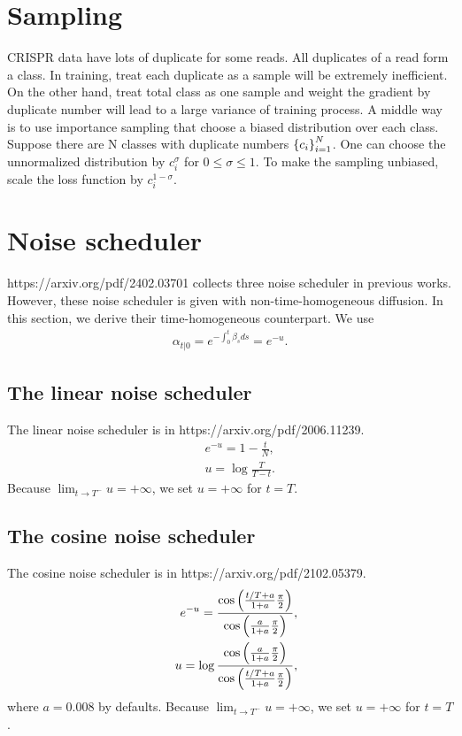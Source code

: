 \documentclass[10pt]{article}
\begin{document}
\section{Sampling}
CRISPR data have lots of duplicate for some reads. All duplicates of a read form a class. In training, treat each duplicate as a sample will be extremely inefficient. On the other hand, treat total class as one sample and weight the gradient by duplicate number will lead to a large variance of training process. A middle way is to use importance sampling that choose a biased distribution over each class. Suppose there are N classes with duplicate numbers $\qty{c_i}_{i=1}^N$. One can choose the unnormalized distribution by $c_i^\sigma$ for $0\le \sigma \le 1$. To make the sampling unbiased, scale the loss function by $c_i^{1-\sigma}$.

\section{Noise scheduler}

https://arxiv.org/pdf/2402.03701 collects three noise scheduler in previous works. However, these noise scheduler is given with non-time-homogeneous diffusion. In this section, we derive their time-homogeneous counterpart. We use
\begin{eqnarray*}
  \alpha_{t|0}= e^{-\int_0^t \beta_s ds} = e^{-u}.
\end{eqnarray*}

\subsection{The linear noise scheduler}
The linear noise scheduler is in https://arxiv.org/pdf/2006.11239.
\begin{eqnarray*}
  &&e^{-u} = 1 - \frac{t}{N},\\
  &&u = \log\frac{T}{T-t}.
\end{eqnarray*}
Because $\lim_{t\to T^-}u = +\infty$, we set $u=+\infty$ for $t=T$.

\subsection{The cosine noise scheduler}
The cosine noise scheduler is in https://arxiv.org/pdf/2102.05379.
\begin{eqnarray*}
  &&e^{-u} = \frac{\cos\qty(\frac{t/T+a}{1+a}\frac{\pi}{2})}{\cos\qty(\frac{a}{1+a}\frac{\pi}{2})},\\
  &&u = \log \frac{\cos\qty(\frac{a}{1+a}\frac{\pi}{2})}{\cos\qty(\frac{t/T+a}{1+a}\frac{\pi}{2})},
\end{eqnarray*}
where $a=0.008$ by defaults. Because $\lim_{t\to T^-}u = +\infty$, we set $u=+\infty$ for $t=T$.
\end{document}
